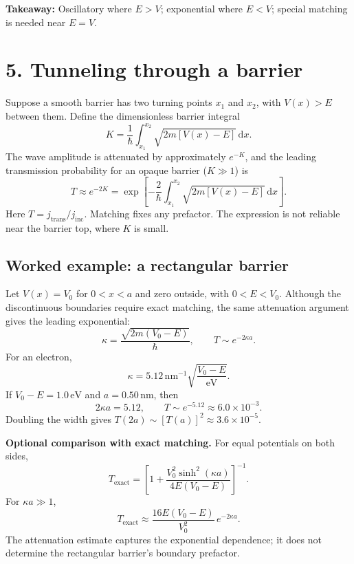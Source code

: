 \documentclass[11pt]{article}
\newcommand{\dd}{\,\mathrm{d}}
\begin{document}
\textbf{Takeaway:} Oscillatory where $E>V$; exponential where $E<V$; special matching is needed near $E=V$.

\newpage
\section*{5. Tunneling through a barrier}
Suppose a smooth barrier has two turning points $x_1$ and $x_2$, with $V(x)>E$ between them. Define the dimensionless barrier integral
\begin{equation}
K=\frac{1}{\hbar}\int_{x_1}^{x_2}\sqrt{2m[V(x)-E]}\dd x.
\end{equation}
The wave amplitude is attenuated by approximately $e^{-K}$, and the leading transmission probability for an opaque barrier ($K\gg1$) is
\begin{equation}
\boxed{T\approx e^{-2K}
=\exp\left[-\frac{2}{\hbar}\int_{x_1}^{x_2}\sqrt{2m[V(x)-E]}\dd x\right].}
\end{equation}
Here $T=j_{\mathrm{trans}}/j_{\mathrm{inc}}$. Matching fixes any prefactor. The expression is not reliable near the barrier top, where $K$ is small.

\subsection*{Worked example: a rectangular barrier}
Let $V(x)=V_0$ for $0<x<a$ and zero outside, with $0<E<V_0$. Although the discontinuous boundaries require exact matching, the same attenuation argument gives the leading exponential:
\begin{equation}
\kappa=\frac{\sqrt{2m(V_0-E)}}{\hbar},\qquad
\boxed{T\sim e^{-2\kappa a}.}
\end{equation}
For an electron,
\begin{equation}
\kappa=5.12\,\mathrm{nm}^{-1}\sqrt{\frac{V_0-E}{\mathrm{eV}}}.
\end{equation}
If $V_0-E=1.0\,\mathrm{eV}$ and $a=0.50\,\mathrm{nm}$, then
\begin{equation}
2\kappa a=5.12,\qquad T\sim e^{-5.12}\approx6.0\times10^{-3}.
\end{equation}
Doubling the width gives $T(2a)\sim[T(a)]^2\approx3.6\times10^{-5}$.

\textbf{Optional comparison with exact matching.} For equal potentials on both sides,
\begin{equation}
T_{\mathrm{exact}}=
\left[1+\frac{V_0^2\sinh^2(\kappa a)}{4E(V_0-E)}\right]^{-1}.
\end{equation}
For $\kappa a\gg1$,
\begin{equation}
T_{\mathrm{exact}}\approx\frac{16E(V_0-E)}{V_0^2}\,e^{-2\kappa a}.
\end{equation}
The attenuation estimate captures the exponential dependence; it does not determine the rectangular barrier's boundary prefactor.
\end{document}
